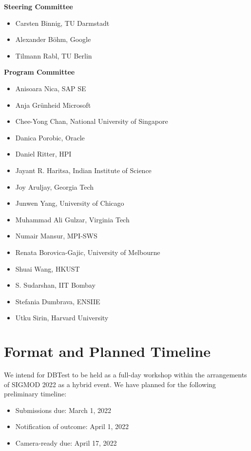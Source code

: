 \documentclass[sigconf]{acmart}
\begin{document}
\textbf{Steering Committee}
\begin{itemize}
	\item Carsten Binnig, TU Darmstadt
	\item Alexander Böhm, Google
	\item Tilmann Rabl, TU Berlin
\end{itemize}

\textbf{Program Committee}
\begin{itemize}
	\item Anisoara Nica, SAP SE
	\item Anja Grünheid Microsoft
	\item Chee-Yong Chan, National University of Singapore
	\item Danica Porobic, Oracle
	\item Daniel Ritter, HPI
	\item Jayant R. Haritsa, Indian Institute of Science
	\item Joy Aruljay, Georgia Tech
	\item Junwen Yang, University of Chicago
	\item Muhammad Ali Gulzar, Virginia Tech
	\item Numair Mansur, MPI-SWS
	\item Renata Borovica-Gajic, University of Melbourne
	\item Shuai Wang, HKUST
	\item S. Sudarshan, IIT Bombay
	\item Stefania Dumbrava, ENSIIE
	\item Utku Sirin, Harvard University
\end{itemize}


\section{Format and Planned Timeline}

We intend for DBTest to be held as a full-day workshop within the arrangements of SIGMOD 2022 as a hybrid event.
We have planned for the following preliminary timeline:
\begin{itemize}
    \item Submissions due: March 1, 2022
    \item Notification of outcome: April 1, 2022
    \item Camera-ready due: April 17, 2022
\end{itemize}
\end{document}
